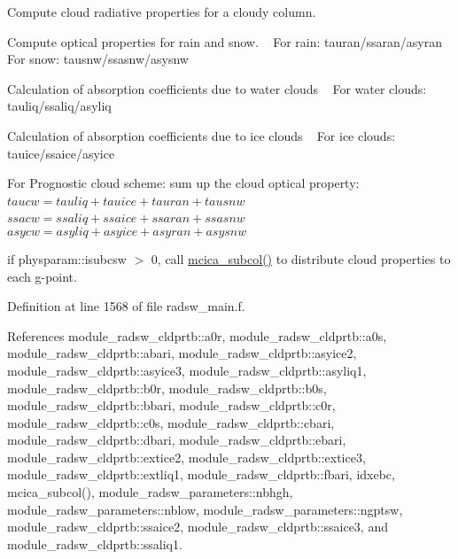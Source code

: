 \begin{DoxyEnumerate}
\item Compute cloud radiative properties for a cloudy column.
\begin{DoxyItemize}
\item Compute optical properties for rain and snow. ~\newline
 For rain\+: tauran/ssaran/asyran ~\newline
 For snow\+: tausnw/ssasnw/asysnw
\item Calculation of absorption coefficients due to water clouds ~\newline
 For water clouds\+: tauliq/ssaliq/asyliq
\item Calculation of absorption coefficients due to ice clouds ~\newline
 For ice clouds\+: tauice/ssaice/asyice
\item For Prognostic cloud scheme\+: sum up the cloud optical property\+: ~\newline
 $ taucw=tauliq+tauice+tauran+tausnw $ ~\newline
 $ ssacw=ssaliq+ssaice+ssaran+ssasnw $ ~\newline
 $ asycw=asyliq+asyice+asyran+asysnw $
\end{DoxyItemize}
\item if physparam\+::isubcsw $>$ 0, call \hyperlink{group__module__radlw__main_ga9318778651bca6ec1f1776da6c21dfda}{mcica\+\_\+subcol()} to distribute cloud properties to each g-\/point. 
\end{DoxyEnumerate}

Definition at line 1568 of file radsw\+\_\+main.\+f.



References module\+\_\+radsw\+\_\+cldprtb\+::a0r, module\+\_\+radsw\+\_\+cldprtb\+::a0s, module\+\_\+radsw\+\_\+cldprtb\+::abari, module\+\_\+radsw\+\_\+cldprtb\+::asyice2, module\+\_\+radsw\+\_\+cldprtb\+::asyice3, module\+\_\+radsw\+\_\+cldprtb\+::asyliq1, module\+\_\+radsw\+\_\+cldprtb\+::b0r, module\+\_\+radsw\+\_\+cldprtb\+::b0s, module\+\_\+radsw\+\_\+cldprtb\+::bbari, module\+\_\+radsw\+\_\+cldprtb\+::c0r, module\+\_\+radsw\+\_\+cldprtb\+::c0s, module\+\_\+radsw\+\_\+cldprtb\+::cbari, module\+\_\+radsw\+\_\+cldprtb\+::dbari, module\+\_\+radsw\+\_\+cldprtb\+::ebari, module\+\_\+radsw\+\_\+cldprtb\+::extice2, module\+\_\+radsw\+\_\+cldprtb\+::extice3, module\+\_\+radsw\+\_\+cldprtb\+::extliq1, module\+\_\+radsw\+\_\+cldprtb\+::fbari, idxebc, mcica\+\_\+subcol(), module\+\_\+radsw\+\_\+parameters\+::nbhgh, module\+\_\+radsw\+\_\+parameters\+::nblow, module\+\_\+radsw\+\_\+parameters\+::ngptsw, module\+\_\+radsw\+\_\+cldprtb\+::ssaice2, module\+\_\+radsw\+\_\+cldprtb\+::ssaice3, and module\+\_\+radsw\+\_\+cldprtb\+::ssaliq1.




